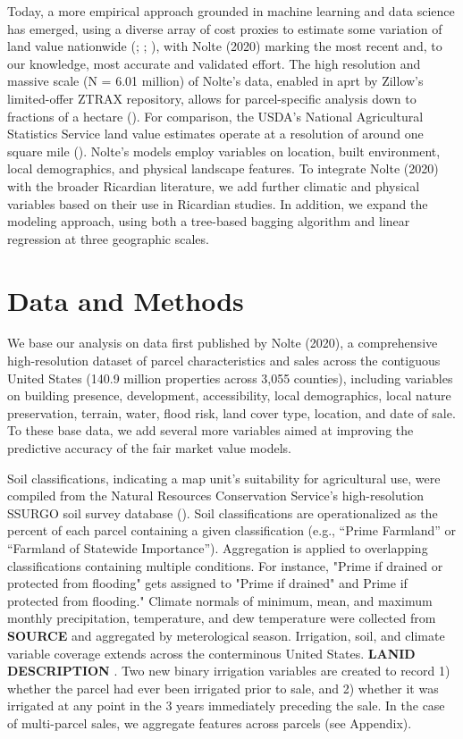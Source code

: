 \documentclass[12pt]{article}
\begin{document}
\par Today, a more empirical approach grounded in machine learning and data science has emerged, using a diverse array of cost proxies to estimate some variation of land value nationwide (\cite{Withey2012MaximisingUSA}; 
\cite{Johnson2020AReduction}; \cite{Lawler2020PlanningConfiguration}), with Nolte (2020) marking the most recent and, to our knowledge, most accurate and validated effort. The high resolution and massive scale (N = 6.01 million) of Nolte's data, enabled in aprt by Zillow's limited-offer ZTRAX repository, allows for parcel-specific analysis down to fractions of a hectare (\cite{Zillow2019ZTRAX:2019-Q4}). For comparison, the USDA's National Agricultural Statistics Service land value estimates operate at a resolution of around one square mile (\cite{USDepartmentofAgriculture2019AgriculturalEstimates}). Nolte's models employ variables on location, built environment, local demographics, and physical landscape features. To integrate Nolte (2020) with the broader Ricardian literature, we add further climatic and physical variables based on their use in Ricardian studies. In addition, we expand the modeling approach, using both a tree-based bagging algorithm and linear regression at three geographic scales.

\section{Data and Methods}
We base our analysis on data first published by Nolte (2020), a comprehensive high-resolution dataset of parcel characteristics and sales across the contiguous United States (140.9 million properties across 3,055 counties), including variables on building presence, development, accessibility, local demographics, local nature preservation, terrain, water, flood risk, land cover type, location, and date of sale. To these base data, we add several more variables aimed at improving the predictive accuracy of the fair market value models.


Soil classifications, indicating a map unit's suitability for agricultural use, were compiled from the Natural Resources Conservation Service’s high-resolution SSURGO soil survey database (\cite{SoilSurveyStaffSoilStates}). Soil classifications are operationalized as the percent of each parcel containing a given classification (e.g., “Prime Farmland” or “Farmland of Statewide Importance”). Aggregation is applied to overlapping classifications containing multiple conditions. For instance, "Prime if drained or protected from flooding" gets assigned to "Prime if drained" and Prime if protected from flooding." Climate normals of minimum, mean, and maximum monthly precipitation, temperature, and dew temperature were collected from \textbf{SOURCE} and aggregated by meterological season. Irrigation, soil, and climate variable coverage extends across the conterminous United States.  \textbf{LANID DESCRIPTION} \cite{Xie2021LANID-US:States}. Two new binary irrigation variables are created to record 1) whether the parcel had ever been irrigated prior to sale, and 2) whether it was irrigated at any point in the 3 years immediately preceding the sale. In the case of multi-parcel sales, we aggregate features across parcels (see Appendix).
\end{document}
